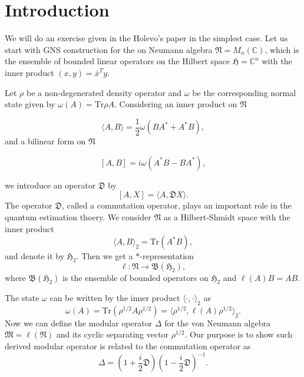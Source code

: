 \section{Introduction}
We will do an exercise given in the Holevo's paper \cite{Holevo_1977} in the simplest case. 
Let us start with GNS construction for the 
on Neumann algebra $\mathfrak{N}=M_n(\mathbb{C})$, which is the ensemble of bounded linear operators on 
the Hilbert space $\mathfrak{H}=\mathbb{C}^n$ with the inner product $(x,y)=\bar{x}^Ty$. 

Let $\rho$ be a non-degenerated density operator and 
$\omega$ be the corresponding normal state given by $\omega(A)=\mbox{Tr}\rho A$.
Considering an inner product on $\mathfrak{N}$

\begin{equation}
\label{innerP}
\langle A, B \rangle =\frac{1}{2}\omega(BA^{\ast}+A^{\ast}B),
\end{equation}
and a bilinear form on $\mathfrak{N}$

$$
[A,B]=i\omega(A^{\ast}B-BA^{\ast}),
$$

we introduce an operator $\mathfrak{D}$ by 
$$
[A,X]=\langle A, \mathfrak{D}X\rangle.
$$
The operator $\mathfrak{D}$, called a commutation operator, plays an important role in the quantum estimation thoery.
We consider $\mathfrak{N}$ as a Hilbert-Shmidt space with the inner product
$$
\langle A, B \rangle_2 =\mbox{Tr}(A^{\ast}B),
$$
and denote it by $\mathfrak{H}_2$.
Then we get a $\ast$-representation 
$$
\ell :\mathfrak{N}\to \mathfrak{B}(\mathfrak{H}_2),
$$
where $\mathfrak{B}(\mathfrak{H}_2)$ is the ensemble of bounded operators on $\mathfrak{H}_2$
and $\ell(A)B=AB$.

The state $\omega$ can be written by the inner product $\langle \cdot, \cdot\rangle_2$ as 
$$
\omega(A)=\mbox{Tr}(\rho^{1/2}A\rho^{1/2})=\langle \rho^{1/2},\ell(A)\rho^{1/2}\rangle_2 .
$$
Now we can define the modular operator $\Delta$ for the von Neumann algebra $\mathfrak{M}=\ell(\mathfrak{N})$ and its cyclic separating vector $\rho^{1/2}$. 
Our purpose is to show such derived modular operator is related to the commutation operator
as
$$
    \Delta=\left(1+\frac{i}{2}\mathfrak{D}\right)\left(1-\frac{i}{2}\mathfrak{D}\right)^{-1}.
$$
